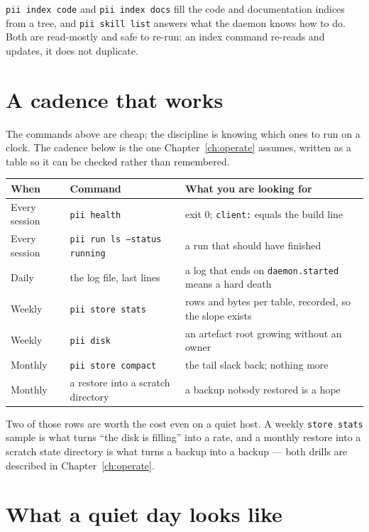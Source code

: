 \texttt{pii index code} and \texttt{pii index docs} fill the code and documentation indices
from a tree, and \texttt{pii skill list} answers what the daemon knows how to do. Both are
read-mostly and safe to re-run: an index command re-reads and updates, it does not
duplicate.

\section{A cadence that works}

The commands above are cheap; the discipline is knowing which ones to run on a clock. The
cadence below is the one Chapter~\ref{ch:operate} assumes, written as a table so it can be
checked rather than remembered.

\begin{longtable}{@{}p{}p{}p{}@{}}
	\toprule
	\textbf{When} & \textbf{Command} & \textbf{What you are looking for} \\
	\midrule
	\endhead
	Every session & \texttt{pii health} & exit 0; \texttt{client:} equals the build line \\
	Every session & \texttt{pii run ls --status running} & a run that should have finished \\
	Daily & the log file, last lines & a log that ends on \texttt{daemon.started} means a
	hard death \\
	Weekly & \texttt{pii store stats} & rows and bytes per table, recorded, so the slope
	exists \\
	Weekly & \texttt{pii disk} & an artefact root growing without an owner \\
	Monthly & \texttt{pii store compact} & the tail slack back; nothing more \\
	Monthly & a restore into a scratch directory & a backup nobody restored is a hope \\
	\bottomrule
\end{longtable}

Two of those rows are worth the cost even on a quiet host. A weekly \texttt{store stats}
sample is what turns \enquote{the disk is filling} into a rate, and a monthly restore into a
scratch state directory is what turns a backup into a backup --- both drills are described
in Chapter~\ref{ch:operate}.

\section{What a quiet day looks like}

